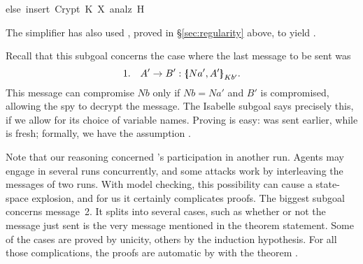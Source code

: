 \begin{isabellebody}
\begin{isamarkuptxt}
\begin{isabelle}
else\ insert\ {}Crypt\ K\ X{}\ {}analz\ H{}{}%
\end{isabelle}
The simplifier has also used , proved in
{\S}\ref{sec:regularity} above, to yield .

Recall that this subgoal concerns the case
where the last message to be sent was
\[ 1.\quad  A'\to B'  : \mathopen{\{\kern-.30em|} Na',A'\mathclose{|\kern-.32em\}}\sb{Kb'}. \]
This message can compromise $Nb$ only if $Nb=Na'$ and $B'$ is compromised,
allowing the spy to decrypt the message.  The Isabelle subgoal says
precisely this, if we allow for its choice of variable names.
Proving  is easy:  was
sent earlier, while  is fresh; formally, we have
the assumption . 

Note that our reasoning concerned 's participation in another
run.  Agents may engage in several runs concurrently, and some attacks work
by interleaving the messages of two runs.  With model checking, this
possibility can cause a state-space explosion, and for us it
certainly complicates proofs.  The biggest subgoal concerns message~2.  It
splits into several cases, such as whether or not the message just sent is
the very message mentioned in the theorem statement.
Some of the cases are proved by unicity, others by
the induction hypothesis.  For all those complications, the proofs are
automatic by  with the theorem .


\end{isamarkuptxt}
\end{isabellebody}
